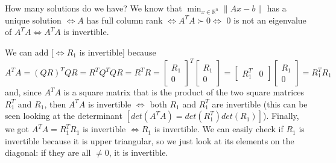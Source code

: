 \documentclass{article}
\begin{document}
How many solutions do we have? We know that $\min_{x \in  \mathds{R}^n}\|Ax - b\|$ has a unique solution $\iff A$ has full column rank $\iff A^{T}A \succ 0 \iff$ 0 is not an eigenvalue of $A^{T}A \iff A^{T}A$ is invertible. 

We can add $[\iff R_{1}$ is invertible$]$ because $A^{T}A = (QR)^{T}QR = R^{T}Q^{T}QR = R^{T}R = \begin{bmatrix} R_{1} \\ 0 \end{bmatrix}^{T} \begin{bmatrix} R_{1} \\ 0 \end{bmatrix} = \begin{bmatrix} R_{1}^{T} & 0 \end{bmatrix} \begin{bmatrix} R_{1} \\ 0 \end{bmatrix} = R_{1}^{T}R_{1}$ and, since $A^{T}A$ is a square matrix that is the product of the two square matrices $R_{1}^{T}$ and $R_{1}$, then $A^{T}A$ is invertible $\iff$ both $R_{1}$ and $R_{1}^{T}$ are invertible (this can be seen looking at the determinant $[ det(A^{T}A) = det(R_{1}^{T}) det(R_{1}) ]$).
Finally, we got $A^{T}A = R_{1}^{T}R_{1}$ is invertible $\iff R_{1}$ is invertible. We can easily check if $R_{1}$ is invertible because it is upper triangular, so we just look at its elements on the diagonal: if they are all $\neq 0$, it is invertible.

\end{document}
